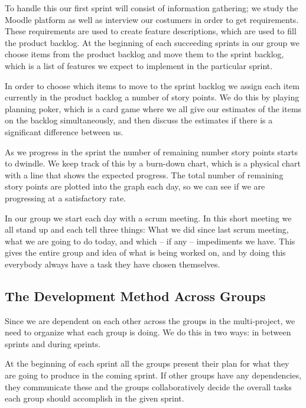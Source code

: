 To handle this our first sprint will consist of information gathering; we study the Moodle platform as well as interview our costumers in order to get requirements.
These requirements are used to create feature descriptions, which are used to fill the product backlog.
At the beginning of each succeeding sprints in our group we choose items from the product backlog and move them to the sprint backlog, which is a list of features we expect to implement in the particular sprint.

In order to choose which items to move to the sprint backlog we assign each item currently in the product backlog a number of story points.
We do this by playing planning poker, which is a card game where we all give our estimates of the items on the backlog simultaneously, and then discuss the estimates if there is a significant difference between us.

As we progress in the sprint the number of remaining number story points starts to dwindle. 
We keep track of this by a burn-down chart, which is a physical chart with a line that shows the expected progress.
The total number of remaining story points are plotted into the graph each day, so we can see if we are progressing at a satisfactory rate.

In our group we start each day with a scrum meeting.
In this short meeting we all stand up and each tell three things: What we did since last scrum meeting, what we are going to do today, and which -- if any -- impediments we have.
This gives the entire group and idea of what is being worked on, and by doing this everybody always have a task they have chosen themselves.

\subsection{The Development Method Across Groups} %
Since we are dependent on each other across the groups in the multi-project, we need to organize what each group is doing.
We do this in two ways: in between sprints and during sprints.

At the beginning of each sprint all the groups present their plan for what they are going to produce in the coming sprint.
If other groups have any dependencies, they communicate these and the groups collaboratively decide the overall tasks each group should accomplish in the given sprint.

